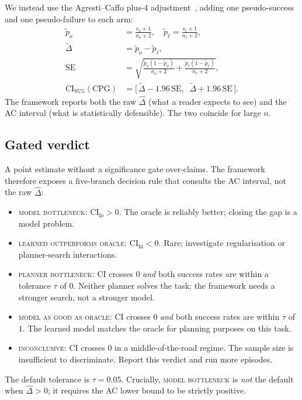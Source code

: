 \documentclass[10pt,letterpaper]{article}
\begin{document}
We instead use the Agresti--Caffo plus-4 adjustment~\citep{agresticaffo2000}, adding one pseudo-success and one pseudo-failure to each arm:
\begin{align}
  \tilde p_o     &= \frac{s_o + 1}{n_o + 2}, \quad
  \tilde p_\ell   = \frac{s_\ell + 1}{n_\ell + 2}, \\
  \tilde \Delta  &= \tilde p_o - \tilde p_\ell, \\
  \mathrm{SE}    &= \sqrt{\frac{\tilde p_o (1 - \tilde p_o)}{n_o + 2} + \frac{\tilde p_\ell (1 - \tilde p_\ell)}{n_\ell + 2}}, \\
  \mathrm{CI}_{95\%}(\mathrm{CPG}) &= \bigl[\, \tilde\Delta - 1.96\,\mathrm{SE}, \;\; \tilde\Delta + 1.96\,\mathrm{SE} \,\bigr].
\end{align}
The framework reports both the raw $\hat\Delta$ (what a reader expects to see) and the AC interval (what is statistically defensible). The two coincide for large $n$.

\subsection{Gated verdict}

A point estimate without a significance gate over-claims. The framework therefore exposes a five-branch decision rule that consults the AC interval, not the raw $\hat\Delta$:
\begin{itemize}
  \item \textsc{model bottleneck}: $\mathrm{CI}_{\mathrm{lo}} > 0$. The oracle is reliably better; closing the gap is a model problem.
  \item \textsc{learned outperforms oracle}: $\mathrm{CI}_{\mathrm{hi}} < 0$. Rare; investigate regularisation or planner-search interactions.
  \item \textsc{planner bottleneck}: CI crosses $0$ \emph{and} both success rates are within a tolerance $\tau$ of $0$. Neither planner solves the task; the framework needs a stronger search, not a stronger model.
  \item \textsc{model as good as oracle}: CI crosses $0$ \emph{and} both success rates are within $\tau$ of $1$. The learned model matches the oracle for planning purposes on this task.
  \item \textsc{inconclusive}: CI crosses $0$ in a middle-of-the-road regime. The sample size is insufficient to discriminate. Report this verdict and run more episodes.
\end{itemize}
The default tolerance is $\tau = 0.05$. Crucially, \textsc{model bottleneck} is \emph{not} the default when $\hat\Delta > 0$; it requires the AC lower bound to be strictly positive.
\end{document}
